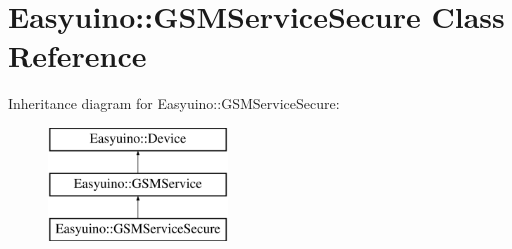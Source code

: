\hypertarget{class_easyuino_1_1_g_s_m_service_secure}{}\section{Easyuino\+:\+:G\+S\+M\+Service\+Secure Class Reference}
\label{class_easyuino_1_1_g_s_m_service_secure}
Inheritance diagram for Easyuino\+:\+:G\+S\+M\+Service\+Secure\+:\begin{figure}[H]
\begin{center}
\leavevmode
\includegraphics[height=3.000000cm]{class_easyuino_1_1_g_s_m_service_secure}
\end{center}
\end{figure}
